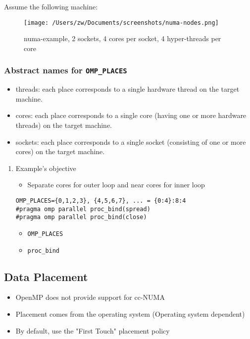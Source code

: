 \documentclass[11pt]{article}
\begin{document}
Assume the following machine:
\begin{figure}[htb]
\centering
\texttt{[image: /Users/zw/Documents/screenshots/numa-nodes.png]}
\caption{\label{fig:numa-example-01}numa-example, 2 sockets, 4 cores per socket, 4 hyper-threads per core}
\end{figure}
\subsubsection{Abstract names for  \texttt{OMP\_PLACES}}
\label{sec-1-3-3}
\begin{itemize}
\item threads: each place corresponds to a single hardware thread on the target machine.
\item cores: each place corresponds to a single core (having one or more hardware threads) on the target machine.
\item sockets: each place corresponds to a single socket (consisting of one or more cores) on the target machine.
\end{itemize}

\begin{enumerate}
\item Example's objective
\label{sec-1-3-3-1}
\begin{itemize}
\item Separate cores for outer loop and near cores for inner loop
\end{itemize}
\begin{verbatim}
OMP_PLACES={0,1,2,3}, {4,5,6,7}, ... = {0:4}:8:4
#pragma omp parallel proc_bind(spread)
#pragma omp parallel proc_bind(close)
\end{verbatim}
\begin{itemize}
\item \texttt{OMP\_PLACES}
\item \texttt{proc\_bind}
\end{itemize}
\end{enumerate}
\subsection{Data Placement}
\label{sec-1-4}
\begin{itemize}
\item OpenMP does not provide support for cc-NUMA
\item Placement comes from the operating system (Operating system dependent)
\item By default, use the "First Touch" placement policy
\end{itemize}
\end{document}

